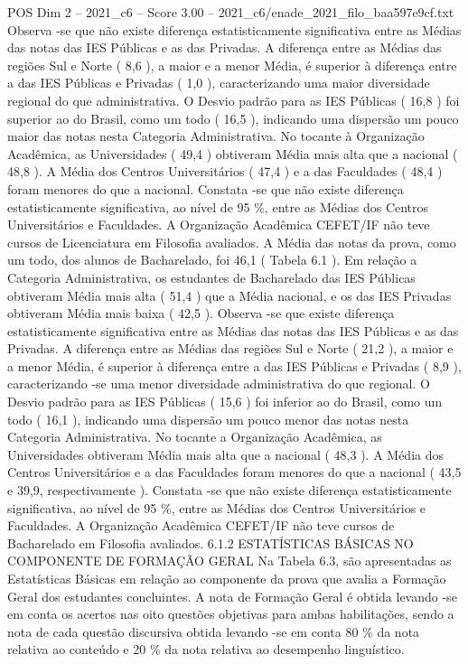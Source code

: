 \begin{textsample}{POS Dim 2 – 2021\_c6 – Score 3.00 – 2021\_c6/enade\_2021\_filo\_baa597e9cf.txt}
Observa -se que não existe diferença estatisticamente significativa entre as Médias das notas das IES Públicas e as das Privadas.
A diferença entre as Médias das regiões Sul e Norte ( 8,6 ), a maior e a menor Média, é superior à diferença entre a das IES Públicas e Privadas ( 1,0 ), caracterizando uma maior diversidade regional do que administrativa.
O Desvio padrão para as IES Públicas ( 16,8 ) foi superior ao do Brasil, como um todo ( 16,5 ), indicando uma dispersão um pouco maior das notas nesta Categoria Administrativa.
No tocante à Organização Acadêmica, as Universidades ( 49,4 ) obtiveram Média mais alta que a nacional ( 48,8 ).
A Média dos Centros Universitários ( 47,4 ) e a das Faculdades ( 48,4 ) foram menores do que a nacional.
Constata -se que não existe diferença estatisticamente significativa, ao nível de 95 \%, entre as Médias dos Centros Universitários e Faculdades.
A Organização Acadêmica CEFET/IF não teve cursos de Licenciatura em Filosofia avaliados.
A Média das notas da prova, como um todo, dos alunos de Bacharelado, foi 46,1 ( Tabela 6.1 ).
Em relação a Categoria Administrativa, os estudantes de Bacharelado das IES Públicas obtiveram Média mais alta ( 51,4 ) que a Média nacional, e os das IES Privadas obtiveram Média mais baixa ( 42,5 ).
Observa -se que existe diferença estatisticamente significativa entre as Médias das notas das IES Públicas e as das Privadas.
A diferença entre as Médias das regiões Sul e Norte ( 21,2 ), a maior e a menor Média, é superior à diferença entre a das IES Públicas e Privadas ( 8,9 ), caracterizando -se uma menor diversidade administrativa do que regional.
O Desvio padrão para as IES Públicas ( 15,6 ) foi inferior ao do Brasil, como um todo ( 16,1 ), indicando uma dispersão um pouco menor das notas nesta Categoria Administrativa.
No tocante a Organização Acadêmica, as Universidades obtiveram Média mais alta que a nacional ( 48,3 ).
A Média dos Centros Universitários e a das Faculdades foram menores do que a nacional ( 43,5 e 39,9, respectivamente ).
Constata -se que não existe diferença estatisticamente significativa, ao nível de 95 \%, entre as Médias dos Centros Universitários e Faculdades.
A Organização Acadêmica CEFET/IF não teve cursos de Bacharelado em Filosofia avaliados. 6.1.2 ESTATÍSTICAS BÁSICAS NO COMPONENTE DE FORMAÇÃO GERAL Na Tabela 6.3, são apresentadas as Estatísticas Básicas em relação ao componente da prova que avalia a Formação Geral dos estudantes concluintes.
A nota de Formação Geral é obtida levando -se em conta os acertos nas oito questões objetivas para ambas habilitações, sendo a nota de cada questão discursiva obtida levando -se em conta 80 \% da nota relativa ao conteúdo e 20 \% da nota relativa ao desempenho linguístico.

\end{textsample}
